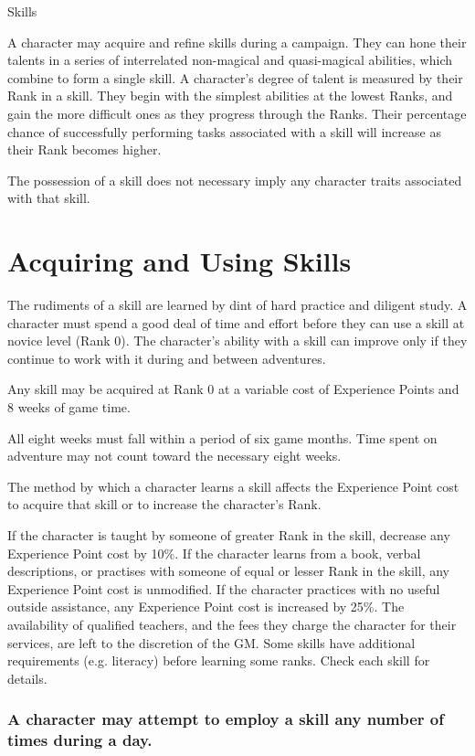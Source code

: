 \begin{Chapter}{Skills}

A character may acquire and refine skills during a campaign. They can
hone their talents in a series of interrelated non-magical and
quasi-magical abilities, which combine to form a single skill. A
character’s degree of talent is measured by their Rank in a
skill. They begin with the simplest abilities at the lowest Ranks, and
gain the more difficult ones as they progress through the Ranks. Their
percentage chance of successfully performing tasks associated with a
skill will increase as their Rank becomes higher.

The possession of a skill does not necessary imply any character
traits associated with that skill.

\section{Acquiring and Using Skills}

The rudiments of a skill are learned by dint of hard practice and
diligent study. A character must spend a good deal of time and effort
before they can use a skill at novice level (Rank 0).  The character’s
ability with a skill can improve only if they continue to work with it
during and between adventures.

Any skill may be acquired at Rank 0 at a variable cost of Experience
Points and 8 weeks of game time.

All eight weeks must fall within a period of six game months.  Time
spent on adventure may not count toward the necessary eight weeks.

The method by which a character learns a skill affects the Experience
Point cost to acquire that skill or to increase the character’s Rank.

If the character is taught by someone of greater Rank in the skill,
decrease any Experience Point cost by 10\%.  If the character learns
from a book, verbal descriptions, or practises with someone of equal
or lesser Rank in the skill, any Experience Point cost is
unmodified. If the character practices with no useful outside
assistance, any Experience Point cost is increased by 25\%. The
availability of qualified teachers, and the fees they charge the
character for their services, are left to the discretion of the GM.
Some skills have additional requirements (e.g.  literacy) before
learning some ranks.  Check each skill for details.

\subsubsection{A character may attempt to employ a skill any number of times during a
day.}


\end{Chapter}
